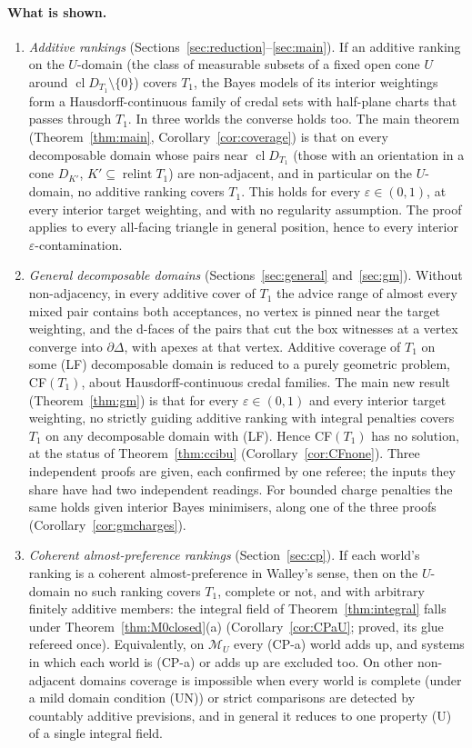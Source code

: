 \documentclass[11pt]{article}
\theoremstyle{definition}
\theoremstyle{remark}
\newcommand{\M}{\mathcal M}
\newcommand{\cl}{\operatorname{cl}}
\newcommand{\relint}{\operatorname{relint}}
\begin{document}
\paragraph{What is shown.}
\begin{enumerate}[leftmargin=*]
\item \emph{Additive rankings} (Sections~\ref{sec:reduction}--\ref{sec:main}). If an additive ranking on the $U$-domain (the class of measurable subsets of a fixed open cone $U$ around $\cl D_{T_1}\setminus\{0\}$) covers $T_1$, the Bayes models of its interior weightings form a Hausdorff-continuous family of credal sets with half-plane charts that passes through $T_1$. In three worlds the converse holds too. The main theorem (Theorem~\ref{thm:main}, Corollary~\ref{cor:coverage}) is that on every decomposable domain whose pairs near $\cl D_{T_1}$ (those with an orientation in a cone $D_{K'}$, $K'\subseteq\relint T_1$) are non-adjacent, and in particular on the $U$-domain, no additive ranking covers $T_1$. This holds for every $\varepsilon\in(0,1)$, at every interior target weighting, and with no regularity assumption. The proof applies to every all-facing triangle in general position, hence to every interior $\varepsilon$-contamination.
\item \emph{General decomposable domains} (Sections~\ref{sec:general} and~\ref{sec:gm}). Without non-adjacency, in every additive cover of $T_1$ the advice range of almost every mixed pair contains both acceptances, no vertex is pinned near the target weighting, and the d-faces of the pairs that cut the box witnesses at a vertex converge into $\partial\Delta$, with apexes at that vertex. Additive coverage of $T_1$ on some (LF) decomposable domain is reduced to a purely geometric problem, CF$(T_1)$, about Hausdorff-continuous credal families. The main new result (Theorem~\ref{thm:gm}) is that for every $\varepsilon\in(0,1)$ and every interior target weighting, no strictly guiding additive ranking with integral penalties covers $T_1$ on any decomposable domain with (LF). Hence CF$(T_1)$ has no solution, at the status of Theorem~\ref{thm:ccibu} (Corollary~\ref{cor:CFnone}). Three independent proofs are given, each confirmed by one referee; the inputs they share have had two independent readings. For bounded charge penalties the same holds given interior Bayes minimisers, along one of the three proofs (Corollary~\ref{cor:gmcharges}).
\item \emph{Coherent almost-preference rankings} (Section~\ref{sec:cp}). If each world's ranking is a coherent almost-preference in Walley's sense, then on the $U$-domain no such ranking covers $T_1$, complete or not, and with arbitrary finitely additive members: the integral field of Theorem~\ref{thm:integral} falls under Theorem~\ref{thm:M0closed}(a) (Corollary~\ref{cor:CPaU}; proved, its glue refereed once). Equivalently, on $\M_U$ every (CP-a) world adds up, and systems in which each world is (CP-a) or adds up are excluded too. On other non-adjacent domains coverage is impossible when every world is complete (under a mild domain condition (UN)) or strict comparisons are detected by countably additive previsions, and in general it reduces to one property (U) of a single integral field.

\end{enumerate}
\end{document}
